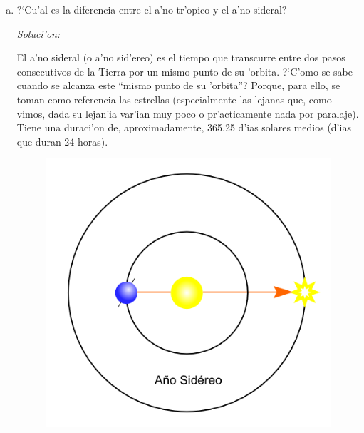 \documentclass{article}
\begin{document}
\begin{enumerate} [a)]
\item ?`Cu'al es la diferencia entre el a'no tr'opico y el a'no sideral?

\emph{Soluci'on:}

El a'no sideral (o a'no sid'ereo) es el tiempo que transcurre entre dos pasos consecutivos de la Tierra por un mismo punto de su 'orbita. ?`C'omo se sabe cuando se alcanza este ``mismo punto de su 'orbita''? Porque, para ello, se toman como referencia las estrellas (especialmente las lejanas que, como vimos, dada su lejan'ia var'ian muy poco o pr'acticamente nada por paralaje). Tiene una duraci'on de, aproximadamente, 365.25 d'ias solares medios (d'ias que duran 24 horas).

\begin{figure}[!h]
  \centering
  \begin{minipage}[b]{0.4\textwidth}
    \includegraphics[width=\textwidth]{ano_sideral.png}
  \end{minipage}
  \hfill
  \begin{minipage}[b]{0.4\textwidth}

\end{minipage}
\end{figure}
\end{enumerate}
\end{document}
